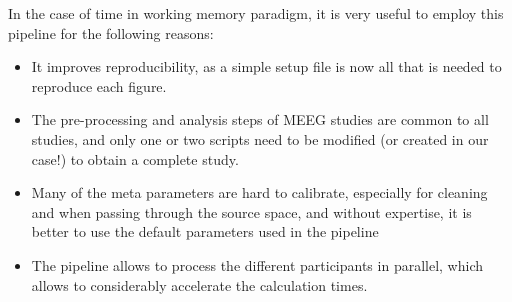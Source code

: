 In the case of time in working memory paradigm, it is very useful to employ this pipeline for the following reasons:
\begin{itemize}
    \item It improves reproducibility, as a simple setup file is now all that is needed to reproduce each figure.
    \item The pre-processing and analysis steps of MEEG studies are common to all studies, and only one or two scripts need to be modified (or created in our case!) to obtain a complete study.
    \item Many of the meta parameters are hard to calibrate, especially for cleaning and when passing through the source space, and without expertise, it is better to use the default parameters used in the pipeline
    \item The pipeline allows to process the different participants in parallel, which allows to considerably accelerate the calculation times.
\end{itemize}
